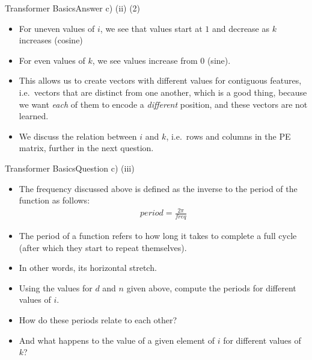\documentclass[t]{beamer}
\begin{document}
\begin{frame}{Transformer Basics}{Answer c) (ii) (2)}
    \begin{itemize}
        \item For uneven values of $i$, we see that values start at $1$
              and decrease as $k$ increases (cosine)
        \item For even values of $k$, we see values increase from $0$ (sine).
        \item This allows us to create vectors with different values for
              contiguous features, i.e.\ vectors that are distinct from
              one another, which is a good thing, because we want \emph{each} of
              them to encode a \emph{different} position, and these vectors are
              not learned.
        \item We discuss the relation between $i$ and $k$, i.e.\ rows and
              columns in the PE matrix, further in the next question.
    \end{itemize}
\end{frame}

\begin{frame}{Transformer Basics}{Question c) (iii)}
    \begin{itemize}
        \item The frequency discussed above is defined as the inverse to the
              period of the function as follows:
              \begin{align*}
                  period = \frac{2\pi}{freq}
              \end{align*}
        \item The period of a function refers to how long it takes to complete a
              full cycle (after which they start to repeat themselves).
        \item In other words, its horizontal stretch.
        \item Using the values for $d$ and $n$ given above, compute the periods
              for different values of $i$.
        \item How do these periods relate to each other?
        \item And what happens to the value of a given element of $i$ for
              different values of $k$?
    \end{itemize}
\end{frame}
\end{document}
